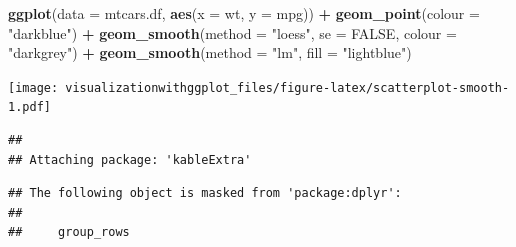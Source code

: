\documentclass[]{krantz}
\makeatletter
\newenvironment{Shaded}{\begin{snugshade}}{\end{snugshade}}
\newcommand{\DataTypeTok}[1]{\textcolor[rgb]{0.13,0.29,0.53}{#1}}
\newcommand{\KeywordTok}[1]{\textcolor[rgb]{0.13,0.29,0.53}{\textbf{#1}}}
\newcommand{\NormalTok}[1]{#1}
\newcommand{\OperatorTok}[1]{\textcolor[rgb]{0.81,0.36,0.00}{\textbf{#1}}}
\newcommand{\OtherTok}[1]{\textcolor[rgb]{0.56,0.35,0.01}{#1}}
\newcommand{\StringTok}[1]{\textcolor[rgb]{0.31,0.60,0.02}{#1}}
\newenvironment{kframe}{%
\medskip{}
\setlength{\fboxsep}{.8em}
 \def\at@end@of@kframe{}%
 \ifinner\ifhmode%
  \def\at@end@of@kframe{\end{minipage}}%
  \begin{minipage}{\columnwidth}%
 \fi\fi%
 \def\FrameCommand##1{\hskip\@totalleftmargin \hskip-\fboxsep
 \colorbox{shadecolor}{##1}\hskip-\fboxsep
     \hskip-\linewidth \hskip-\@totalleftmargin \hskip\columnwidth}%
 \MakeFramed {\advance\hsize-\width
   \@totalleftmargin\z@ \linewidth\hsize
   \@setminipage}}%
 {\par\unskip\endMakeFramed%
 \at@end@of@kframe}
\renewenvironment{Shaded}{\begin{kframe}}{\end{kframe}}
\makeatother
\begin{document}
\begin{Shaded}
\begin{Highlighting}[]
\KeywordTok{ggplot}\NormalTok{(}\DataTypeTok{data =}\NormalTok{ mtcars.df, }\KeywordTok{aes}\NormalTok{(}\DataTypeTok{x =}\NormalTok{ wt, }\DataTypeTok{y =}\NormalTok{ mpg)) }\OperatorTok{+}
\StringTok{  }\KeywordTok{geom_point}\NormalTok{(}\DataTypeTok{colour =} \StringTok{"darkblue"}\NormalTok{) }\OperatorTok{+}
\StringTok{  }\KeywordTok{geom_smooth}\NormalTok{(}\DataTypeTok{method =} \StringTok{"loess"}\NormalTok{, }\DataTypeTok{se =} \OtherTok{FALSE}\NormalTok{, }\DataTypeTok{colour =} \StringTok{"darkgrey"}\NormalTok{) }\OperatorTok{+}\StringTok{ }
\StringTok{  }\KeywordTok{geom_smooth}\NormalTok{(}\DataTypeTok{method =} \StringTok{"lm"}\NormalTok{, }\DataTypeTok{fill =} \StringTok{"lightblue"}\NormalTok{)}
\end{Highlighting}
\end{Shaded}

\texttt{[image: visualizationwithggplot\_files/figure-latex/scatterplot-smooth-1.pdf]}

\begin{verbatim}
## 
## Attaching package: 'kableExtra'
\end{verbatim}

\begin{verbatim}
## The following object is masked from 'package:dplyr':
## 
##     group_rows
\end{verbatim}
\end{document}
